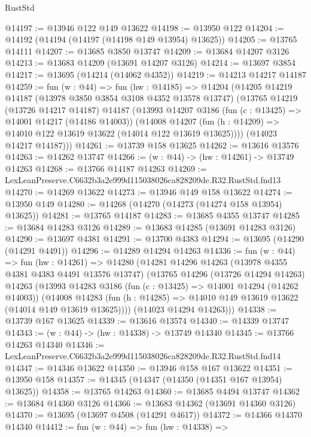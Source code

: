 \begin{lexlean}{RustStd}
\begin{coremodule}
@14197 := @13946 @122 @149 @13622
@14198 := @13950 @122
@14204 := @14192 (@14194 (@14197 (@14198 @149 @13954) @13625))
@14205 := @13765 @14111
@14207 := @13685 @3850 @13747
@14209 := @13684 @14207 @3126
@14213 := @13683 @14209 (@13691 @14207 @3126)
@14214 := @13697 @3854
@14217 := @13695 (@14214 (@14062 @4352))
@14219 := @14213 @14217 @14187
@14259 := fun (w : @44) =>
  fun (hw : @14185) =>
  @14204
    (@14205
      @14219
      @14187
      (@13978 @3850 @3854 @3108 @4352 @13578 @13747)
      (@13765
        @14219
        (@13726 @14217 @14187)
        @14187
        (@13993
          @14207
          @3186
          (fun (c : @13425) => @14001 @14217 (@14186 @14003))
          (@14008
            @14207
            (fun (h : @14209) => @14010 @122 @13619 @13622 (@14014 @122 @13619 @13625))))
        (@14023 @14217 @14187)))
@14261 := @13739 @158 @13625
@14262 := @13616 @13576
@14263 := @14262 @13747
@14266 := (w : @44) -> (hw : @14261) -> @13749 @14263
@14268 := @13766 @14187 @14263
@14269 := LexLeanPreserve.C6632b3a2e999d115038026ca828209de.R32.RustStd.fnd13
@14270 := @14269 @13622
@14273 := @13946 @149 @158 @13622
@14274 := @13950 @149
@14280 := @14268 (@14270 (@14273 (@14274 @158 @13954) @13625))
@14281 := @13765 @14187
@14283 := @13685 @4355 @13747
@14285 := @13684 @14283 @3126
@14289 := @13683 @14285 (@13691 @14283 @3126)
@14290 := @13697 @4381
@14291 := @13700 @4383
@14294 := @13695 (@14290 (@14291 @4491))
@14296 := @14289 @14294 @14263
@14336 := fun (w : @44) =>
  fun (hw : @14261) =>
  @14280
    (@14281
      @14296
      @14263
      (@13978 @4355 @4381 @4383 @4491 @13576 @13747)
      (@13765
        @14296
        (@13726 @14294 @14263)
        @14263
        (@13993
          @14283
          @3186
          (fun (c : @13425) => @14001 @14294 (@14262 @14003))
          (@14008
            @14283
            (fun (h : @14285) => @14010 @149 @13619 @13622 (@14014 @149 @13619 @13625))))
        (@14023 @14294 @14263)))
@14338 := @13739 @167 @13625
@14339 := @13616 @13574
@14340 := @14339 @13747
@14343 := (w : @44) -> (hw : @14338) -> @13749 @14340
@14345 := @13766 @14263 @14340
@14346 := LexLeanPreserve.C6632b3a2e999d115038026ca828209de.R32.RustStd.fnd14
@14347 := @14346 @13622
@14350 := @13946 @158 @167 @13622
@14351 := @13950 @158
@14357 := @14345 (@14347 (@14350 (@14351 @167 @13954) @13625))
@14358 := @13765 @14263
@14360 := @13685 @4494 @13747
@14362 := @13684 @14360 @3126
@14366 := @13683 @14362 (@13691 @14360 @3126)
@14370 := @13695 (@13697 @4508 (@14291 @4617))
@14372 := @14366 @14370 @14340
@14412 := fun (w : @44) =>
  fun (hw : @14338) =>

\end{coremodule}
\end{lexlean}
